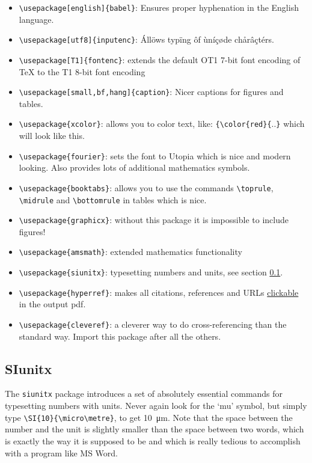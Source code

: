 \documentclass{article}
\begin{document}
\begin{itemize}
\item \verb|\usepackage[english]{babel}|: Ensures proper hyphenation in the English language.
\item \verb|\usepackage[utf8]{inputenc}|: Állöws typïng ôf ùníçøde chårâçtérs.
\item \verb|\usepackage[T1]{fontenc}|: extends the default OT1 7-bit font encoding of TeX to the T1 8-bit font encoding
\item \verb|\usepackage[small,bf,hang]{caption}|: Nicer captions for figures and tables.
\item \verb|\usepackage{xcolor}|: allows you to color text, like: \verb|{\color{red}{|..\verb|}| which will look {\color{red} like this}.
\item \verb|\usepackage{fourier}|: sets the font to Utopia which is nice and modern looking. Also provides lots of additional mathematics symbols.
\item \verb|\usepackage{booktabs}|: allows you to use the commands \verb|\toprule|, \verb|\midrule| and \verb|\bottomrule| in tables which is nice.
\item \verb|\usepackage{graphicx}|: without this package it is impossible to include figures!
\item \verb|\usepackage{amsmath}|: extended mathematics functionality
\item \verb|\usepackage{siunitx}|: typesetting numbers and units, see section \ref{sec:siunitx}.
\item \verb|\usepackage{hyperref}|: makes all citations, references and URLs \hyperref[clickable]{clickable} in the output pdf. \label{clickable}
\item \verb|\usepackage{cleveref}|: a cleverer way to do cross-referencing than the standard way. Import this package after all the others.
\end{itemize}


\subsection{SIunitx}\label{sec:siunitx}

The \verb|siunitx| package introduces a set of absolutely essential commands for typesetting numbers with units. Never again look for the `mu' symbol, but simply type \verb|\SI{10}{\micro\metre}|, to get \SI{10}{\micro\metre}. Note that the space between the number and the unit is slightly smaller than the space between two words, which is exactly the way it is supposed to be and which is really tedious to accomplish with a program like MS Word.
\end{document}
